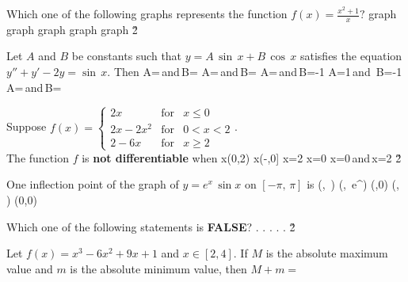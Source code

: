 \documentclass[amsfonts,bezier,leqno,fleqn,12pt,a4paper]{article}
\begin{document}
{{\begin{large}
\newpage



\item %
Which one of the following graphs represents the function $\displaystyle f(x)=\frac{x^{2}+1}{x}?$
\sc
\be
\mbox{graph}
\ee
\be
\mbox{graph}
\ee
\be
\mbox{graph}
\ee
\be
\mbox{graph}
\ee
\be
\mbox{graph}
\ee
\v2



\item %
Let $A$ and $B$ be constants such that $y=A\,\sin\,x+B\,\cos\,x$ satisfies the equation $y''+y'-2y=\sin\,x$. Then
\sc
\be
\displaystyle A=\,\mbox{and}\,B=
\ee
\be
\displaystyle A=\,\mbox{and}\,B=
\ee
\be
\displaystyle A=\,\mbox{and}\,B=-1
\ee
\be
A=1\,\mbox{and}\, B=-1
\ee
\be
\displaystyle A=\,\mbox{and}\,B=
\ee

\newpage



\item %
Suppose $f(x)= \left\{\begin{array}{lll} 2x & \mbox{for} & x\leq 0 \\ \displaystyle 2x-2x^2 & \mbox{for} & 0 < x <2\\ 2-6x & \mbox{for} & x\geq 2 \end{array}\right.$.\\ The function $f$ is \textbf{not differentiable} when
\sc
\be
x\in(0,2)
\ee
\be
x\in(-\infty,0]
\ee
\be
x=2
\ee
\be
x=0
\ee
\be
x=0\,\mbox{and}\,x=2
\ee
\v2



\item %
One inflection point of the graph of $y=e^x\,\sin x$ on $[-\pi,\,\pi]$ is
\sc
\be
\displaystyle \left(,\, \right)
\ee
\be
\displaystyle \left(,\, e^{}\right)
\ee
\be
(\pi,0)
\ee
\be
\displaystyle \left(,\, \right)
\ee
\be
(0,0)
\ee

\newpage



\item %
Which one of the following statements is \textbf{FALSE}?
\sc
\be
.
\ee
\be
.
\ee
\be
.
\ee
\be
.
\ee
\be
.
\ee
\v2



\item %
Let $f(x)=x^3-6x^2+9x+1$ and $x\in[2,4].$ If $M$ is the absolute maximum value and $m$ is the absolute minimum value, then $M+m=$
\sc
{}
\ee
{}
\ee
{}
\ee
{}
\ee
{}
\ee


\end{large}}}
\end{document}
